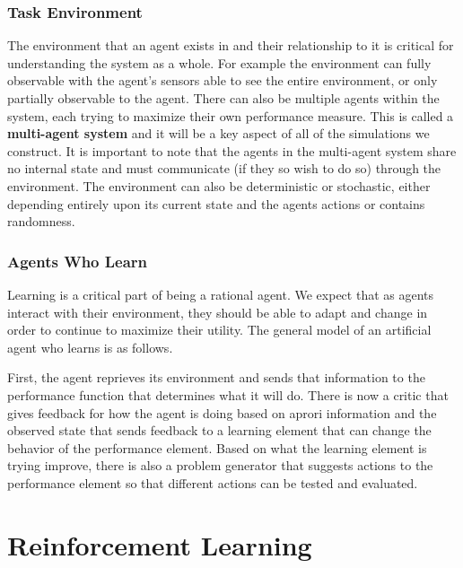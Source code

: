 \documentclass[12pt,twoside]{reedthesis}
\begin{document}
\subsection{Task Environment}
The environment that an agent exists in and their relationship to it is critical for understanding the system as a whole. For example the environment can fully observable with the agent's sensors able to see the entire environment, or only partially observable to the agent. There can also be multiple agents within the system, each trying to maximize their own performance measure. This is called a \textbf{multi-agent system} and it will be a key aspect of all of the simulations we construct. It is important to note that the agents in the multi-agent system share no internal state and must communicate (if they so wish to do so) through the environment. The environment can also be deterministic or stochastic, either depending entirely upon its current state and the agents actions or contains randomness.
	
\subsection{Agents Who Learn}

Learning is a critical part of being a rational agent. We expect that as agents interact with their environment, they should be able to adapt and change in order to continue to maximize their utility. The general model of an artificial agent who learns is as follows. 



First, the agent reprieves its environment and sends that information to the performance function that determines what it will do. There is now a critic that gives feedback for how the agent is doing based on aprori information and the observed state that sends feedback to a learning element that can change the behavior of the performance element. Based on what the learning element is trying improve, there is also a problem generator that suggests actions to the performance element so that different actions can be tested and evaluated. \cite{Russel2010}
\chapter{Reinforcement Learning}	
\end{document}
